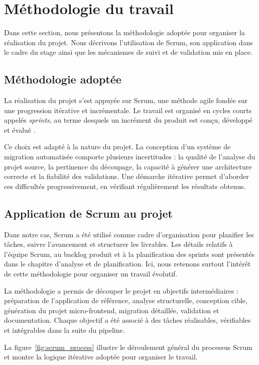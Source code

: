 \section{Méthodologie du travail}

Dans cette section, nous présentons la méthodologie adoptée pour organiser la réalisation du projet. Nous décrivons l'utilisation de Scrum, son application dans le cadre du stage ainsi que les mécanismes de suivi et de validation mis en place.

\subsection{Méthodologie adoptée}

La réalisation du projet s'est appuyée sur Scrum, une méthode agile fondée sur une progression itérative et incrémentale. Le travail est organisé en cycles courts appelés \textit{sprints}, au terme desquels un incrément du produit est conçu, développé et évalué \cite{scrum_guide_fr}.

Ce choix est adapté à la nature du projet. La conception d'un système de migration automatisée comporte plusieurs incertitudes : la qualité de l'analyse du projet source, la pertinence du découpage, la capacité à générer une architecture correcte et la fiabilité des validations. Une démarche itérative permet d'aborder ces difficultés progressivement, en vérifiant régulièrement les résultats obtenus.

\subsection{Application de Scrum au projet}

Dans notre cas, Scrum a été utilisé comme cadre d'organisation pour planifier les tâches, suivre l'avancement et structurer les livrables. Les détails relatifs à l'équipe Scrum, au backlog produit et à la planification des sprints sont présentés dans le chapitre d'analyse et de planification. Ici, nous retenons surtout l'intérêt de cette méthodologie pour organiser un travail évolutif.

La méthodologie a permis de découper le projet en objectifs intermédiaires : préparation de l'application de référence, analyse structurelle, conception cible, génération du projet micro-frontend, migration détaillée, validation et documentation. Chaque objectif a été associé à des tâches réalisables, vérifiables et intégrables dans la suite du pipeline.

La figure~\ref{fig:scrum_process} illustre le déroulement général du processus Scrum et montre la logique itérative adoptée pour organiser le travail.

